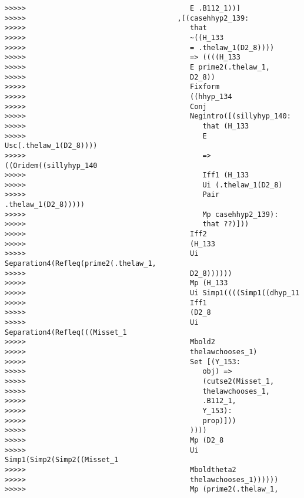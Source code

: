 \documentclass[12pt]{article}
\begin{document}
\begin{verbatim}
>>>>>                                       E .B112_1))]
>>>>>                                    ,[(casehhyp2_139:
>>>>>                                       that
>>>>>                                       ~((H_133
>>>>>                                       = .thelaw_1(D2_8))))
>>>>>                                       => ((((H_133
>>>>>                                       E prime2(.thelaw_1,
>>>>>                                       D2_8))
>>>>>                                       Fixform
>>>>>                                       ((hhyp_134
>>>>>                                       Conj
>>>>>                                       Negintro([(sillyhyp_140:
>>>>>                                          that (H_133
>>>>>                                          E Usc(.thelaw_1(D2_8))))
>>>>>                                          => ((Oridem((sillyhyp_140
>>>>>                                          Iff1 (H_133
>>>>>                                          Ui (.thelaw_1(D2_8)
>>>>>                                          Pair .thelaw_1(D2_8)))))
>>>>>                                          Mp casehhyp2_139):
>>>>>                                          that ??)]))
>>>>>                                       Iff2
>>>>>                                       (H_133
>>>>>                                       Ui Separation4(Refleq(prime2(.thelaw_1,
>>>>>                                       D2_8))))))
>>>>>                                       Mp (H_133
>>>>>                                       Ui Simp1((((Simp1((dhyp_11
>>>>>                                       Iff1
>>>>>                                       (D2_8
>>>>>                                       Ui Separation4(Refleq(((Misset_1
>>>>>                                       Mbold2
>>>>>                                       thelawchooses_1)
>>>>>                                       Set [(Y_153:
>>>>>                                          obj) =>
>>>>>                                          (cutse2(Misset_1,
>>>>>                                          thelawchooses_1,
>>>>>                                          .B112_1,
>>>>>                                          Y_153):
>>>>>                                          prop)]))
>>>>>                                       ))))
>>>>>                                       Mp (D2_8
>>>>>                                       Ui Simp1(Simp2(Simp2((Misset_1
>>>>>                                       Mboldtheta2
>>>>>                                       thelawchooses_1))))))
>>>>>                                       Mp (prime2(.thelaw_1,

\end{verbatim}
\end{document}
